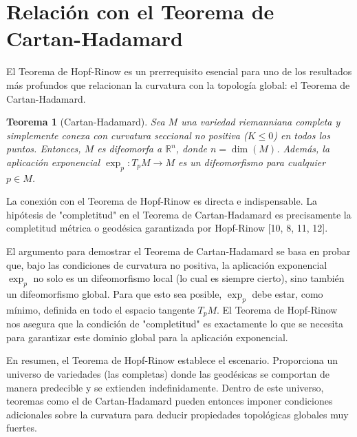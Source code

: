\documentclass[12pt, a4paper]{report}
\theoremstyle{miestilo}
\newtheorem{teorema}{Teorema}[chapter]
\theoremstyle{midefinicion}
\begin{document}
\section{Relación con el Teorema de Cartan-Hadamard}

El Teorema de Hopf-Rinow es un prerrequisito esencial para uno de los resultados más profundos que relacionan la curvatura con la topología global: el Teorema de Cartan-Hadamard.

\begin{teorema}[Cartan-Hadamard]
Sea $M$ una variedad riemanniana completa y simplemente conexa con curvatura seccional no positiva ($K \le 0$) en todos los puntos. Entonces, $M$ es difeomorfa a $\mathbb{R}^n$, donde $n = \dim(M)$. Además, la aplicación exponencial $\exp_p: T_pM \to M$ es un difeomorfismo para cualquier $p \in M$.
\end{teorema}

La conexión con el Teorema de Hopf-Rinow es directa e indispensable. La hipótesis de "completitud" en el Teorema de Cartan-Hadamard es precisamente la completitud métrica o geodésica garantizada por Hopf-Rinow [10, 8, 11, 12].

El argumento para demostrar el Teorema de Cartan-Hadamard se basa en probar que, bajo las condiciones de curvatura no positiva, la aplicación exponencial $\exp_p$ no solo es un difeomorfismo local (lo cual es siempre cierto), sino también un difeomorfismo global. Para que esto sea posible, $\exp_p$ debe estar, como mínimo, definida en todo el espacio tangente $T_pM$. El Teorema de Hopf-Rinow nos asegura que la condición de "completitud" es exactamente lo que se necesita para garantizar este dominio global para la aplicación exponencial.

En resumen, el Teorema de Hopf-Rinow establece el escenario. Proporciona un universo de variedades (las completas) donde las geodésicas se comportan de manera predecible y se extienden indefinidamente. Dentro de este universo, teoremas como el de Cartan-Hadamard pueden entonces imponer condiciones adicionales sobre la curvatura para deducir propiedades topológicas globales muy fuertes.
\end{document}
